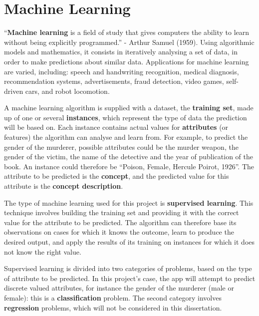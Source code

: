 \documentclass{mproj}
\begin{document}
\section{Machine Learning}\label{machine_learning}
``\textbf{Machine learning} is a field of study that gives computers the ability to learn without being explicitly programmed.'' - Arthur Samuel (1959). \cite[Chapter~3]{quotearthursamuel} Using algorithmic models and mathematics, it consists in iteratively analysing a set of data, in order to make predictions about similar data. Applications for machine learning are varied, including: speech and handwriting recognition, medical diagnosis, recommendation systems, advertisements, fraud detection, video games, self-driven cars, and robot locomotion. \par 

A machine learning algorithm is supplied with a dataset, the \textbf{training set}, made up of one or several \textbf{instances}, which represent the type of data the prediction will be based on. Each instance contains actual values for \textbf{attributes} (or features) the algorithm can analyse and learn from. \cite[Chapter~2]{wekabook} For example, to predict the gender of the murderer, possible attributes could be the murder weapon, the gender of the victim, the name of the detective and the year of publication of the book. An instance could therefore be ``Poison, Female, Hercule Poirot, 1926''. The attribute to be predicted is the \textbf{concept}, and the predicted value for this attribute is the \textbf{concept description}. \par 

The type of machine learning used for this project is \textbf{supervised learning}. This technique involves building the training set and providing it with the correct value for the attribute to be predicted. \cite{machinelearningcourse} The algorithm can therefore base its observations on cases for which it knows the outcome, learn to produce the desired output, and apply the results of its training on instances for which it does not know the right value. \par

Supervised learning is divided into two categories of problems, based on the type of attribute to be predicted. In this project's case, the app will attempt to predict discrete valued attributes, for instance the gender of the murderer (male or female): this is a \textbf{classification} problem. The second category involves \textbf{regression} problems, which will not be considered in this dissertation.
\end{document}
